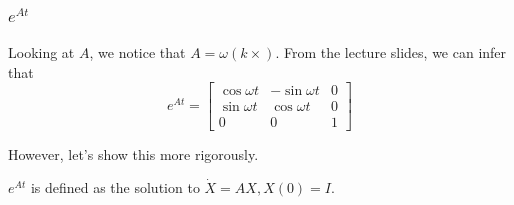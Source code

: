 \documentclass[11pt]{article}
\begin{document}
\subsubsection{\(e^{At}\)}
\label{sec:orgebe54a5}
Looking at \(A\), we notice that \(A = \omega(k\times)\).
From the lecture slides, we can infer that
\begin{equation*}
e^{At}
=
\begin{bmatrix}
\cos{\omega t} & -\sin{\omega t} & 0 \\
\sin{\omega t} & \cos{\omega t}  & 0 \\
0              & 0               & 1
\end{bmatrix}
\end{equation*}

However, let's show this more rigorously.

\(e^{At}\) is defined as the solution to \(\dot{X} = AX, X(0) = I\).
\end{document}
